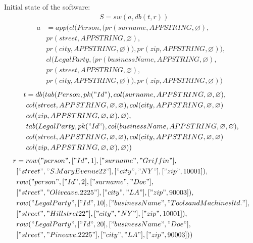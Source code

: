 \documentclass[11pt]{article}
\begin{document}
\newpage
Initial state of the software:
\medskip
\hline
\begin{align*}
&	S = sw(a, db(t,r))
\end{align*}
\begin{align*}
a &= app(cl(Person, (pr(surname, APPSTRING, \varnothing), \\
& pr(street, APPSTRING, \varnothing), \\
& pr(city, APPSTRING, \varnothing)), pr(zip, APPSTRING, \varnothing)), \\
& cl(LegalParty, (pr(businessName, APPSTRING, \varnothing), \\
& pr(street, APPSTRING, \varnothing), \\
& pr(city, APPSTRING, \varnothing)), pr(zip, APPSTRING, \varnothing))
\end{align*}
\begin{align*}
t &= db(tab(Person, pk("Id"), col(surname, APPSTRING, \varnothing, \varnothing), \\
& col(street, APPSTRING, \varnothing, \varnothing), col(city, APPSTRING, \varnothing, \varnothing) \\
& col(zip, APPSTRING, \varnothing, \varnothing), \varnothing), \\
& tab(LegalParty, pk("Id"),  col(businessName, APPSTRING, \varnothing, \varnothing), \\
& col(street, APPSTRING, \varnothing, \varnothing), col(city, APPSTRING, \varnothing, \varnothing) \\
& col(zip, APPSTRING, \varnothing, \varnothing), \varnothing)) 
\end{align*}
\begin{align*}
r &= row("person", ["Id", 1], ["surname", "Griffin"], \\
& ["street", "S. Mary Evenue 22"], ["city", "NY"], ["zip", 10001]), \\
& row("person", ["Id", 2], ["surname", "Doe"], \\
& ["street", "Olive ave. 2225"], ["city", "LA"], ["zip", 90003]), \\
& row("LegalParty", ["Id", 10], ["businessName", "Tools and Machines ltd."], \\
& ["street", "Hill stret 22"], ["city", "NY"], ["zip", 10001]), \\
& row("LegalParty", ["Id", 20], ["businessName", "Doe"], \\
& ["street", "Pine ave. 2225"], ["city", "LA"], ["zip", 90003]))
\end{align*}
\end{document}
